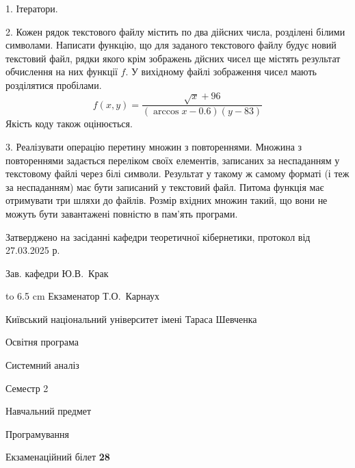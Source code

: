 \documentclass[12pt, ukrainian]{article}
\begin{document}
{%
1. Ітератори.%
\par
\vspace{2mm}

2. Кожен рядок текстового файлу містить по два дійсних числа, розділені білими символами.
Написати функцію, що для заданого текстового файлу будує новий текстовий файл, рядки якого крім зображень дйсних чисел ще містять результат обчислення на них функції $f$. У вихідному файлі зображення чисел мають розділятися пробілами. 
$$f(x, y) =\frac{\sqrt x + 96}{(\arccos x - 0.6) (y - 83)}$$ 
Якість коду також оцінюється.

\par
\vspace{2mm}

3. Реалізувати операцію перетину множин з повтореннями. Множина з повтореннями задається переліком своїх елементів, записаних за неспаданням у текстовому файлі через білі символи. Результат у такому ж самому форматі (і теж за неспаданням) має бути записаний у текстовий файл. Питома функція має отримувати три шляхи до файлів. Розмір вхідних множин такий, що вони не можуть бути завантажені повністю в пам’ять програми.

}
{\smallskip\smallskip \begin {scriptsize} Затверджено на засіданні кафедри теоретичної кібернетики, протокол   від   27.03.2025 р.\par\smallskip\smallskip\smallskip\smallskip
{\parbox {6.5 cm} {Зав. кафедри \dotfill Ю.В.~Крак}}\hspace {0.7cm} {\hbox to 6.5 cm { Екзаменатор \dotfill Т.О.~Карнаух}} \end{scriptsize}}
\vspace{2.9cm}
{{\begin {scriptsize}\par
{ \center  Київський національний університет імені Тараса Шевченка \par}
{\parbox {5 cm}{Освітня програма \hfill}{\parbox {7 cm}{Системний аналіз\hfill}}\parbox {6 cm}{\hfill Семестр 2}}\par
{\parbox {5 cm} {Навчальний предмет \hfill}\parbox {7 cm}{Програмування \hfill}\parbox {6cm}{\hfill}\par}\vspace{-15pt} \end{scriptsize}}{\center Екзаменаційний білет \No \textbf { 28 }\par}}
\end{document}
